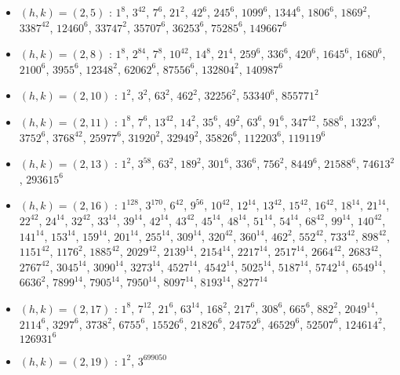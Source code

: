 \begin{itemize}
\item $(h,k)=(2,5)$ : $1^{8}$, $3^{42}$, $7^{6}$, $21^{2}$, $42^{6}$, $245^{6}$, $1099^{6}$, $1344^{6}$, $1806^{6}$, $1869^{2}$, $3387^{42}$, $12460^{6}$, $33747^{2}$, $35707^{6}$, $36253^{6}$, $75285^{6}$, $149667^{6}$
\item $(h,k)=(2,8)$ : $1^{8}$, $2^{84}$, $7^{8}$, $10^{42}$, $14^{8}$, $21^{4}$, $259^{6}$, $336^{6}$, $420^{6}$, $1645^{6}$, $1680^{6}$, $2100^{6}$, $3955^{6}$, $12348^{2}$, $62062^{6}$, $87556^{6}$, $132804^{2}$, $140987^{6}$
\item $(h,k)=(2,10)$ : $1^{2}$, $3^{2}$, $63^{2}$, $462^{2}$, $32256^{2}$, $53340^{6}$, $855771^{2}$
\item $(h,k)=(2,11)$ : $1^{8}$, $7^{6}$, $13^{42}$, $14^{2}$, $35^{6}$, $49^{2}$, $63^{6}$, $91^{6}$, $347^{42}$, $588^{6}$, $1323^{6}$, $3752^{6}$, $3768^{42}$, $25977^{6}$, $31920^{2}$, $32949^{2}$, $35826^{6}$, $112203^{6}$, $119119^{6}$
\item $(h,k)=(2,13)$ : $1^{2}$, $3^{58}$, $63^{2}$, $189^{2}$, $301^{6}$, $336^{6}$, $756^{2}$, $8449^{6}$, $21588^{6}$, $74613^{2}$, $293615^{6}$
\item $(h,k)=(2,16)$ : $1^{128}$, $3^{170}$, $6^{42}$, $9^{56}$, $10^{42}$, $12^{14}$, $13^{42}$, $15^{42}$, $16^{42}$, $18^{14}$, $21^{14}$, $22^{42}$, $24^{14}$, $32^{42}$, $33^{14}$, $39^{14}$, $42^{14}$, $43^{42}$, $45^{14}$, $48^{14}$, $51^{14}$, $54^{14}$, $68^{42}$, $99^{14}$, $140^{42}$, $141^{14}$, $153^{14}$, $159^{14}$, $201^{14}$, $255^{14}$, $309^{14}$, $320^{42}$, $360^{14}$, $462^{2}$, $552^{42}$, $733^{42}$, $898^{42}$, $1151^{42}$, $1176^{2}$, $1885^{42}$, $2029^{42}$, $2139^{14}$, $2154^{14}$, $2217^{14}$, $2517^{14}$, $2664^{42}$, $2683^{42}$, $2767^{42}$, $3045^{14}$, $3090^{14}$, $3273^{14}$, $4527^{14}$, $4542^{14}$, $5025^{14}$, $5187^{14}$, $5742^{14}$, $6549^{14}$, $6636^{2}$, $7899^{14}$, $7905^{14}$, $7950^{14}$, $8097^{14}$, $8193^{14}$, $8277^{14}$
\item $(h,k)=(2,17)$ : $1^{8}$, $7^{12}$, $21^{6}$, $63^{14}$, $168^{2}$, $217^{6}$, $308^{6}$, $665^{6}$, $882^{2}$, $2049^{14}$, $2114^{6}$, $3297^{6}$, $3738^{2}$, $6755^{6}$, $15526^{6}$, $21826^{6}$, $24752^{6}$, $46529^{6}$, $52507^{6}$, $124614^{2}$, $126931^{6}$
\item $(h,k)=(2,19)$ : $1^{2}$, $3^{699050}$

\end{itemize}
